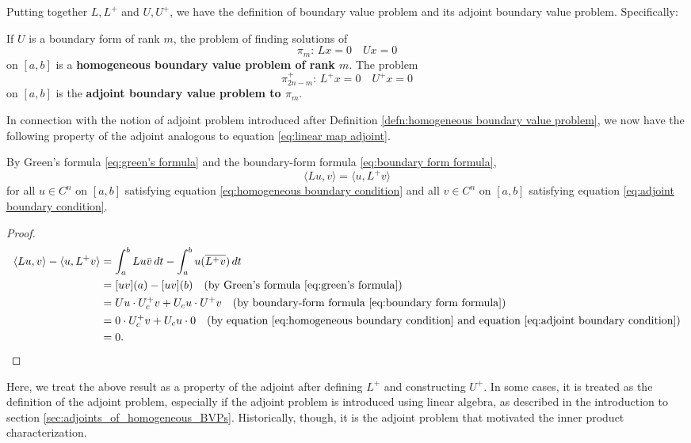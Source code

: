 \documentclass[11pt, oneside, a4paper]{article}
\begin{document}
Putting together $L, L^+$ and $U, U^+$, we have the definition of boundary value problem and its adjoint boundary value problem. Specifically:

\begin{defn}\cite[p.291]{CoddingtonLevinson}\label{defn:adjoint boundary value problem}
    If $U$ is a boundary form of rank $m$, the problem of finding solutions of
    \[\pi_m:\,Lx=0\quad Ux=0\]
    on $[a,b]$ is a \textbf{homogeneous boundary value problem of rank $m$}. The problem
    \[\pi_{2n-m}^+:\,L^+x=0\quad U^+x=0\]
    on $[a,b]$ is the \textbf{adjoint boundary value problem to $\pi_m$}.
\end{defn}

In connection with the notion of adjoint problem introduced after Definition \ref{defn:homogeneous boundary value problem}, we now have the following property of the adjoint analogous to equation \eqref{eq:linear map adjoint}.

\begin{prop}\label{prop:(Lu,v)=(u,L^+v)}
    By Green's formula \eqref{eq:green's formula} and the boundary-form formula \eqref{eq:boundary form formula}, 
    \[\langle Lu, v\rangle = \langle u, L^+v\rangle\]
    for all $u\in C^n$ on $[a,b]$ satisfying equation \eqref{eq:homogeneous boundary condition} and all $v\in C^n$ on $[a,b]$ satisfying equation \eqref{eq:adjoint boundary condition}.
\end{prop}
\begin{proof}
    \begin{equation}
        \begin{split}
            \langle Lu, v\rangle - \langle u, L^+v\rangle &= \int_a^b Lu\bar{v}\,dt - \int_a^b u(\overline{L^+v})\,dt\\
            &= [uv](a) - [uv](b) \quad\mbox{(by Green's formula \eqref{eq:green's formula})}\\
            &= Uu\cdot U_c^+ v + U_c u\cdot U^+v \quad\mbox{(by boundary-form formula \eqref{eq:boundary form formula})}\\
            &= 0\cdot U_c^+ v + U_c u \cdot 0 \quad\mbox{(by equation \eqref{eq:homogeneous boundary condition} and equation \eqref{eq:adjoint boundary condition})}\\
            &= 0.\qedhere
        \end{split}
    \end{equation}
\end{proof}

Here, we treat the above result as a property of the adjoint after defining $L^+$ and constructing $U^+$. 
In some cases, it is treated as the definition of the adjoint problem, especially if the adjoint problem is introduced using linear algebra, as described in the introduction to section \ref{sec:adjoints_of_homogeneous_BVPs}. Historically, though, it is the adjoint problem that motivated the inner product characterization.
\end{document}
